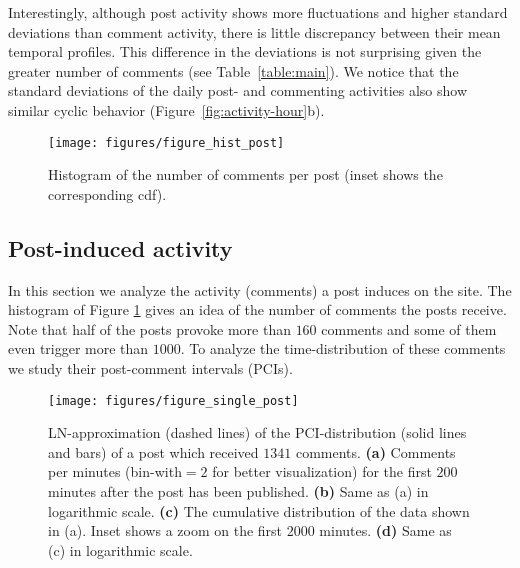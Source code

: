 \documentclass[twoside,11pt]{article}
\begin{document}
Interestingly, although post activity shows more fluctuations and
higher standard deviations than comment activity, there is little
discrepancy between their mean temporal profiles.  This difference in
the deviations is not surprising given the greater number of comments
(see Table~\ref{table:main}).  We notice that the standard deviations
of the daily post- and commenting activities also show similar cyclic
behavior (Figure~\ref{fig:activity-hour}b).


\begin{figure}[!tb]\centering
\texttt{[image: figures/figure\_hist\_post]}
\caption{Histogram of the number of comments per post (inset shows the corresponding cdf).}
\label{fig:hist-post}
\end{figure}
\subsection{Post-induced activity}\noindent
In this section we analyze the activity (comments) a post induces on
the site.  The histogram of Figure \ref{fig:hist-post} gives an idea
of the number of comments the posts receive.  Note that half of the
posts provoke more than $160$ comments and some of them even trigger
more than $1000$.  To analyze the time-distribution of these comments
we study their post-comment intervals (PCIs).

\begin{figure}[!t]\centering
\texttt{[image: figures/figure\_single\_post]}
\caption{LN-approximation (dashed lines) of the
  PCI-distribution (solid lines and bars) of a post 
   which received $1341$ comments.  
  \textbf{(a)} Comments per
  minutes (bin-with$=2$ for better visualization) for the
  first $200$ minutes after the post has been published.  
  \textbf{(b)} Same as (a) in logarithmic scale.  
  \textbf{(c)} The cumulative distribution of the data shown in (a).
  Inset shows a zoom on the first $2000$ minutes.  
  \textbf{(d)} Same as (c) in logarithmic scale.}
\label{fig:post1}
\end{figure}
\end{document}
